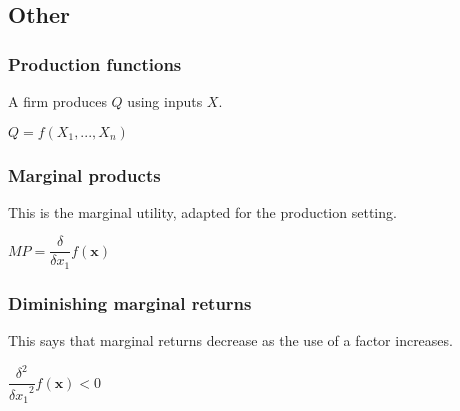 
\subsection{Other}

\subsubsection{Production functions}

A firm produces \(Q\) using inputs \(X\).

\(Q=f(X_1,...,X_n)\)

\subsubsection{Marginal products}

This is the marginal utility, adapted for the production setting.

\(MP=\dfrac{\delta }{\delta x_1}f(\mathbf x)\)

\subsubsection{Diminishing marginal returns}

This says that marginal returns decrease as the use of a factor increases.

\(\dfrac{\delta^2 }{{\delta x_1}^2}f(\mathbf x)<0\)

